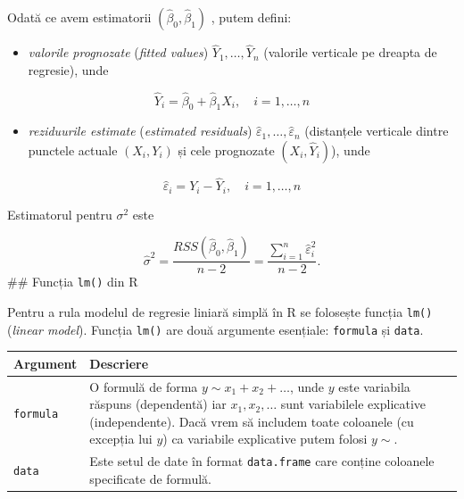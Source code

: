 \documentclass[]{article}
\providecommand{\tightlist}{%
  \setlength{\itemsep}{0pt}\setlength{\parskip}{0pt}}
\begin{document}
Odată ce avem estimatorii \((\hat\beta_0,\hat\beta_1)\) , putem defini:

\begin{itemize}
\tightlist
\item
  \emph{valorile prognozate} (\emph{fitted values})
  \(\hat Y_1,\ldots,\hat Y_n\) (valorile verticale pe dreapta de
  regresie), unde
\end{itemize}

\[
\hat Y_i=\hat\beta_0+\hat\beta_1X_i,\quad i=1,\ldots,n
\]

\begin{itemize}
\tightlist
\item
  \emph{reziduurile estimate} (\emph{estimated residuals})
  \(\hat \varepsilon_1,\ldots,\hat \varepsilon_n\) (distanțele verticale
  dintre punctele actuale \((X_i,Y_i)\) și cele prognozate
  \((X_i,\hat Y_i)\)), unde
\end{itemize}

\[
\hat\varepsilon_i=Y_i-\hat Y_i,\quad i=1,\ldots,n
\]

Estimatorul pentru \(\sigma^2\) este

\[
\hat{\sigma}^2 = \frac{RSS(\hat{\beta}_0,\hat{\beta}_1)}{n-2} = \frac{\sum_{i=1}^{n}\hat{\varepsilon}_i^2}{n-2}.
\] \#\# Funcția \texttt{lm()} din R

Pentru a rula modelul de regresie liniară simplă în R se folosește
funcția \texttt{lm()} (\emph{linear model}). Funcția \texttt{lm()} are
două argumente esențiale: \texttt{formula} și \texttt{data}.

\begin{longtable}[]{@{}ll@{}}
\toprule
\begin{minipage}[b]{0.18\columnwidth}\raggedright\strut
Argument\strut
\end{minipage} & \begin{minipage}[b]{0.67\columnwidth}\raggedright\strut
Descriere\strut
\end{minipage}\tabularnewline
\midrule
\endhead
\begin{minipage}[t]{0.18\columnwidth}\raggedright\strut
\texttt{formula}\strut
\end{minipage} & \begin{minipage}[t]{0.67\columnwidth}\raggedright\strut
O formulă de forma \(y \sim x_1 + x_2 + \ldots\), unde \(y\) este
variabila răspuns (dependentă) iar \(x_1,x_2,\ldots\) sunt variabilele
explicative (independente). Dacă vrem să includem toate coloanele (cu
excepția lui \(y\)) ca variabile explicative putem folosi
\(y \sim .\)\strut
\end{minipage}\tabularnewline
\begin{minipage}[t]{0.18\columnwidth}\raggedright\strut
\texttt{data}\strut
\end{minipage} & \begin{minipage}[t]{0.67\columnwidth}\raggedright\strut
Este setul de date în format \texttt{data.frame} care conține coloanele
specificate de formulă.\strut
\end{minipage}\tabularnewline
\bottomrule
\end{longtable}
\end{document}
